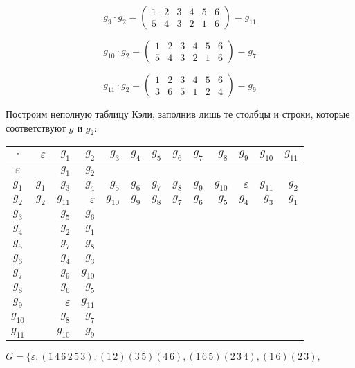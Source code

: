 \documentclass[utf8,14pt,a4paper,oneside,russian]{book}
\begin{document}
	\[ g_{9}\cdot g_{2} = \left( 
	\begin{array}{cccccc}
	1&2&3&4&5&6\\
	5&4&3&2&1&6
	\end{array} 
	\right) = g_{11} \]
	
	\[ g_{10}\cdot g_{2} = \left( 
	\begin{array}{cccccc}
	1&2&3&4&5&6\\
	5&4&3&2&1&6
	\end{array} 
	\right) = g_{7} \]
	
	
	\[ g_{11}\cdot g_{2} = \left( 
	\begin{array}{cccccc}
	1&2&3&4&5&6\\
	3&6&5&1&2&4
	\end{array} 
	\right) = g_{9} \]
	
	\vspace{\baselineskip}
	
	Построим неполную таблицу Кэли, заполнив лишь те столбцы и строки, которые соответствуют $g_{}$ и $g_{2}$:
	
	\vspace{\baselineskip}
	
	\begin{longtable}{c|r|r|r|r|r|r|r|r|r|r|r|r}
	$\cdot$&$\varepsilon$&$g_{1}$&$g_{2}$&$g_{3}$&$g_{4}$&$g_{5}$&$g_{6}$&$g_{7}$&$g_{8}$&$g_{9}$&$g_{10}$&$g_{11}$\\\hline
	$\varepsilon$&&$g_{1}$&$g_{2}$&&&&&&&&\\
	$g_{1}$&$g_{1}$&$g_{3}$&$g_{4}$&$g_{5}$&$g_{6}$&$g_{7}$&$g_{8}$&$g_{9}$&$g_{10}$&$\varepsilon$&$g_{11}$&$g_{2}$\\
	$g_{2}$&$g_{2}$&$g_{11}$&$\varepsilon$&$g_{10}$&$g_{9}$&$g_{8}$&$g_{7}$&$g_{6}$&$g_{5}$&$g_{4}$&$g_{3}$&$g_{1}$\\
	$g_{3}$&&$g_{5}$&$g_{6}$&&&&&&&&\\
	$g_{4}$&&$g_{2}$&$g_{1}$&&&&&&&&\\
	$g_{5}$&&$g_{7}$&$g_{8}$&&&&&&&&\\
	$g_{6}$&&$g_{4}$&$g_{3}$&&&&&&&&\\
	$g_{7}$&&$g_{9}$&$g_{10}$&&&&&&&&\\
	$g_{8}$&&$g_{6}$&$g_{5}$&&&&&&&&\\
	$g_{9}$&&$\varepsilon$&$g_{11}$&&&&&&&&\\
	$g_{10}$&&$g_{8}$&$g_{7}$&&&&&&&&\\
	$g_{11}$&&$g_{10}$&$g_{9}$&&&&&&&&
	\end{longtable}

	
	$G=\{\varepsilon,(1\,4\,6\,2\,5\,3),(1\,2)(3\,5)(4\,6),(1\,6\,5)(2\,3\,4),(1\,6)(2\,3),$
	
\end{document}
